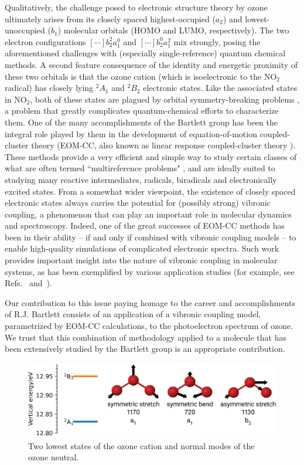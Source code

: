 \documentclass[
12pt,
a4paper,
prb,
superscriptaddress,
]{revtex4}
\begin{document}
Qualitatively, the challenge posed to electronic structure theory by ozone
ultimately arises from its closely spaced highest-occupied ($a_2$) and
lowest-unoccupied ($b_1$) molecular orbitals (HOMO and LUMO, respectively).
The two electron configurations $[\cdots]b_2^2 a_1^0$ and $[\cdots]b_2^0
a_1^2$ mix strongly, posing the aforementioned challenges with (especially
single-reference) quantum chemical methods.   A second feature consequence of
the identity and energetic proximity of these two orbitals is that the ozone
cation (which is isoelectronic to the NO$_2$ radical) has closely lying
$^2A_1$ and $^2B_2$ electronic states.   Like the associated states in NO$_2$,
both of these states are plagued by orbital symmetry-breaking problems
\cite{Davidson:SymmBreak:76}, a problem that greatly complicates
quantum-chemical efforts to characterize them.   One of the many
accomplishments of the Bartlett group has been the integral role played by
them in the development of equation-of-motion coupled-cluster theory
\cite{Stanton:93:EOMCC, Nooijen:EOMEA:95, Bartlett:CC_review:07} (EOM-CC, also
known as linear response coupled-cluster theory \cite{Koch:90:LinResp}). These
methods provide a very efficient and simple way to study certain classes of
what are often termed ``multireference problems" \cite{Krylov:EOMRev:07}, and
are ideally suited to studying many reactive intermediates, radicals,
biradicals and electronically excited states.   From a somewhat wider
viewpoint, the existence of closely spaced electronic states always carries
the potential for (possibly strong) vibronic coupling, a phenomenon that can
play an important role in molecular dynamics and spectroscopy.  Indeed, one of
the great successes of EOM-CC methods has been in their ability -- if and only
if combined with vibronic coupling models -- to enable high-quality
simulations of complicated electronic spectra.   Such work provides important
insight into the nature of vibronic coupling in molecular systems, as has been
exemplified by various application studies (for example, see
Refs.~\cite{Stanton:NO3:07} and~\cite{Koppel:02}).

Our contribution to this issue paying homage to the career and accomplishments
of R.J. Bartlett consists of an application of a vibronic coupling model,
parametrized by EOM-CC calculations, to the photoelectron spectrum of ozone.
We trust that this combination of methodology applied to a molecule that has
been extensively studied by the Bartlett group is an appropriate contribution.

\begin{figure}
    \includegraphics[width = 16 cm]{./figures/ozone_intro}
    \caption{ 
        Two lowest states of the ozone cation and normal modes of the ozone
        neutral.
    }
    \label{fig:ozone_intro}
\end{figure}
\end{document}

